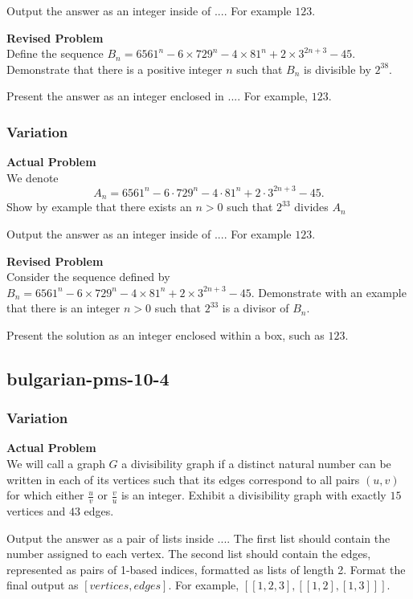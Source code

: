 Output the answer as an integer inside of $\boxed{...}$. For example $\boxed{123}$.

\textbf{Revised Problem}\\
Define the sequence \( B_n = 6561^n - 6 \times 729^n - 4 \times 81^n + 2 \times 3^{2n+3} - 45 \). Demonstrate that there is a positive integer \( n \) such that \( B_n \) is divisible by \( 2^{38} \).

Present the answer as an integer enclosed in \(\boxed{...}\). For example, \(\boxed{123}\).

\subsubsection{Variation}
\textbf{Actual Problem}\\
We denote $$ A_{n} = 6561^{n} - 6 \cdot 729^{n} - 4 \cdot 81^{n} + 2 \cdot 3^{2 n + 3} - 45. $$ Show by example that there exists an $n>0$ such that $2^{33}$ divides $A_{n}$

Output the answer as an integer inside of $\boxed{...}$. For example $\boxed{123}$.

\textbf{Revised Problem}\\
Consider the sequence defined by \( B_n = 6561^n - 6 \times 729^n - 4 \times 81^n + 2 \times 3^{2n + 3} - 45 \). Demonstrate with an example that there is an integer \( n > 0 \) such that \( 2^{33} \) is a divisor of \( B_n \).

Present the solution as an integer enclosed within a box, such as \(\boxed{123}\).

\subsection{bulgarian-pms-10-4}
\subsubsection{Variation}
\textbf{Actual Problem}\\
We will call a graph $G$ a divisibility graph if a distinct natural number can be written in each of its vertices such that its edges correspond to all pairs $(u, v)$ for which either $\frac{u}{v}$ or $\frac{v}{u}$ is an integer. Exhibit a divisibility graph with exactly $15$ vertices and $43$ edges.

Output the answer as a pair of lists inside $\boxed{...}$. The first list should contain the number assigned to each vertex. The second list should contain the edges, represented as pairs of 1-based indices, formatted as lists of length 2. Format the final output as $\boxed{[vertices, edges]}$. For example, $\boxed{[[1,2,3], [[1, 2], [1, 3]]]}$.

